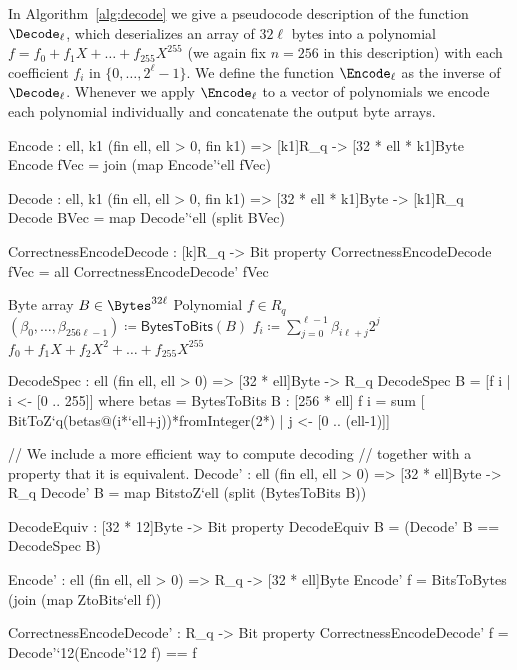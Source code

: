 In Algorithm~\ref{alg:decode} we give a pseudocode description of the
function $\Decode_\ell$, which deserializes an array of $32\ell$ bytes
into a polynomial $f = f_0 + f_1X + \dots + f_{255}X^{255}$ 
(we again fix $n=256$ in this description) with each
coefficient $f_i$ in  $\{0,\dots,2^\ell-1\}$. 
We define the function $\Encode_\ell$ as the inverse of $\Decode_\ell$.
Whenever we apply $\Encode_\ell$ to a vector of polynomials we encode
each polynomial individually and concatenate the output byte arrays.

\begin{code}
  Encode : {ell, k1} (fin ell, ell > 0, fin k1) => [k1]R_q -> [32 * ell * k1]Byte
  Encode fVec = join (map Encode'`{ell} fVec)

  Decode : {ell, k1} (fin ell, ell > 0, fin k1) => [32 * ell * k1]Byte -> [k1]R_q
  Decode BVec = map Decode'`{ell} (split BVec)
  
  CorrectnessEncodeDecode : [k]R_q -> Bit
  property CorrectnessEncodeDecode fVec = all CorrectnessEncodeDecode' fVec
\end{code}

\begin{algorithm}
  \caption{$\Decode_\ell\colon\Bytes^{32\ell}\rightarrow R_q$
  }
  \label{alg:decode}
  \begin{algorithmic}
    \Require Byte array $B \in \Bytes^{32\ell}$ 
    \Ensure Polynomial $f \in R_q$
    \State $(\beta_0,\dots,\beta_{256\ell-1}) \coloneqq \mathsf{BytesToBits}(B)$
      \State $f_i \coloneqq \sum_{j=0}^{\ell-1}\beta_{i\ell+j}2^{j}$
    \EndFor
    \State \Return $f_0 + f_1X + f_2X^2 + \dots + f_{255}X^{255}$
  \end{algorithmic}
\end{algorithm}

\begin{code}
  DecodeSpec : {ell} (fin ell, ell > 0) => [32 * ell]Byte -> R_q
  DecodeSpec B = [f i | i <- [0 .. 255]]
      where betas = BytesToBits B : [256 * ell]
            f i = sum [ BitToZ`{q}(betas@(i*`ell+j))*fromInteger(2^^j)
                      | j <- [0 .. (ell-1)]]

  // We include a more efficient way to compute decoding
  // together with a property that it is equivalent.
  Decode' : {ell} (fin ell, ell > 0) => [32 * ell]Byte -> R_q
  Decode' B = map BitstoZ`{ell} (split (BytesToBits B))

  DecodeEquiv : [32 * 12]Byte -> Bit
  property DecodeEquiv B = (Decode' B == DecodeSpec B)
  
  Encode' : {ell} (fin ell, ell > 0) => R_q -> [32 * ell]Byte
  Encode' f = BitsToBytes (join (map ZtoBits`{ell} f))
  
  CorrectnessEncodeDecode' : R_q -> Bit
  property CorrectnessEncodeDecode' f = Decode'`{12}(Encode'`{12} f) == f
\end{code}

